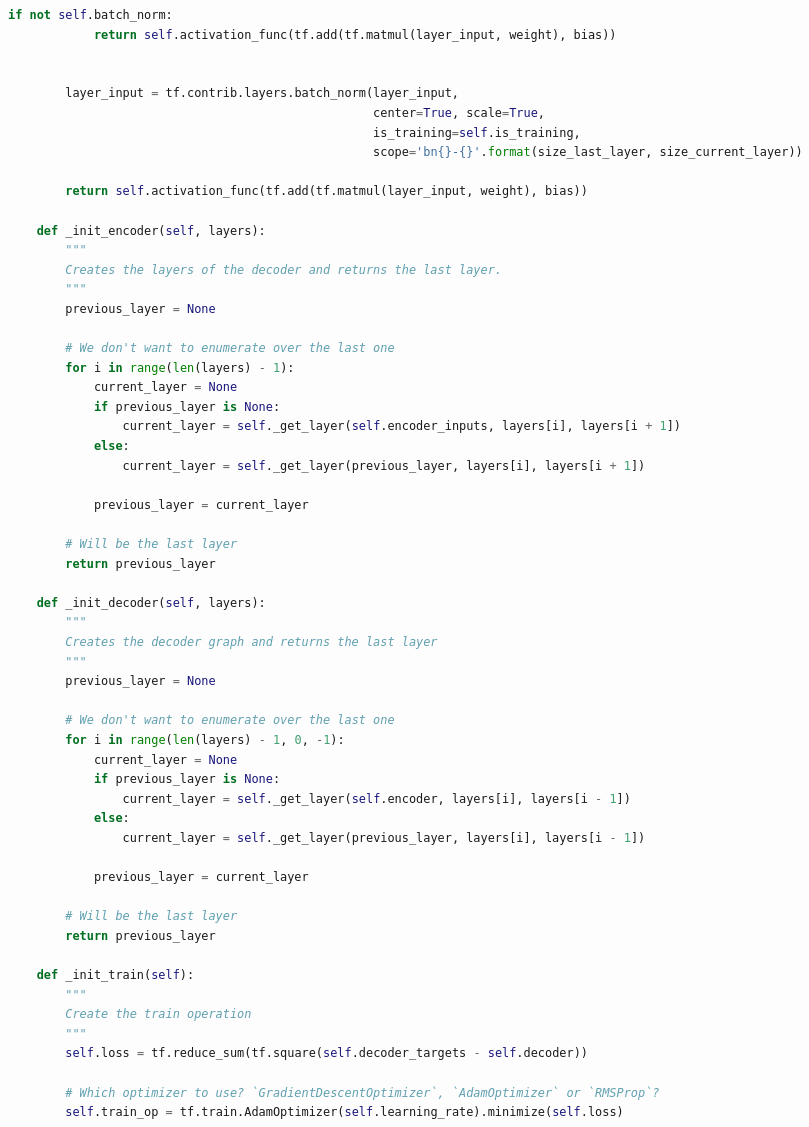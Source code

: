 \begin{landscape}
\begin{multicols}{2}
\begin{lstlisting}[language=Python]
        if not self.batch_norm:
            return self.activation_func(tf.add(tf.matmul(layer_input, weight), bias))


        layer_input = tf.contrib.layers.batch_norm(layer_input,
                                                   center=True, scale=True,
                                                   is_training=self.is_training,
                                                   scope='bn{}-{}'.format(size_last_layer, size_current_layer))

        return self.activation_func(tf.add(tf.matmul(layer_input, weight), bias))

    def _init_encoder(self, layers):
        """
        Creates the layers of the decoder and returns the last layer.
        """
        previous_layer = None

        # We don't want to enumerate over the last one
        for i in range(len(layers) - 1):
            current_layer = None
            if previous_layer is None:
                current_layer = self._get_layer(self.encoder_inputs, layers[i], layers[i + 1])
            else:
                current_layer = self._get_layer(previous_layer, layers[i], layers[i + 1])

            previous_layer = current_layer

        # Will be the last layer
        return previous_layer

    def _init_decoder(self, layers):
        """
        Creates the decoder graph and returns the last layer
        """
        previous_layer = None

        # We don't want to enumerate over the last one
        for i in range(len(layers) - 1, 0, -1):
            current_layer = None
            if previous_layer is None:
                current_layer = self._get_layer(self.encoder, layers[i], layers[i - 1])
            else:
                current_layer = self._get_layer(previous_layer, layers[i], layers[i - 1])

            previous_layer = current_layer

        # Will be the last layer
        return previous_layer

    def _init_train(self):
        """
        Create the train operation
        """
        self.loss = tf.reduce_sum(tf.square(self.decoder_targets - self.decoder))

        # Which optimizer to use? `GradientDescentOptimizer`, `AdamOptimizer` or `RMSProp`?
        self.train_op = tf.train.AdamOptimizer(self.learning_rate).minimize(self.loss)


\end{lstlisting}
\end{multicols}
\end{landscape}
